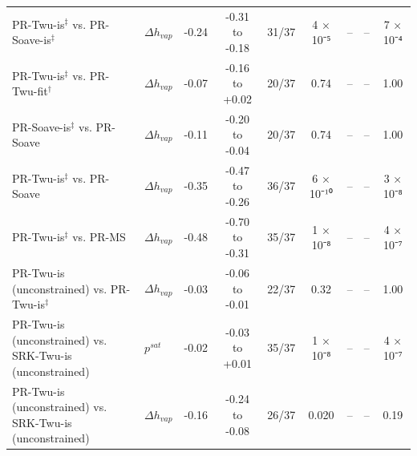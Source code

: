 \begin{table}[H]
\begin{tabular}{llccccccc}
PR-Twu-is$^{\ddagger}$ vs. PR-Soave-is$^{\ddagger}$ & $\Delta h_{vap}$ & -0.24 & -0.31 to -0.18 & 31/37 & 4 × 10⁻⁵ & -- & -- & 7 × 10⁻⁴ \\
PR-Twu-is$^{\ddagger}$ vs. PR-Twu-fit$^{\dagger}$ & $\Delta h_{vap}$ & -0.07 & -0.16 to +0.02 & 20/37 & 0.74 & -- & -- & 1.00 \\
PR-Soave-is$^{\ddagger}$ vs. PR-Soave & $\Delta h_{vap}$ & -0.11 & -0.20 to -0.04 & 20/37 & 0.74 & -- & -- & 1.00 \\
PR-Twu-is$^{\ddagger}$ vs. PR-Soave & $\Delta h_{vap}$ & -0.35 & -0.47 to -0.26 & 36/37 & 6 × 10⁻¹⁰ & -- & -- & 3 × 10⁻⁸ \\
PR-Twu-is$^{\ddagger}$ vs. PR-MS & $\Delta h_{vap}$ & -0.48 & -0.70 to -0.31 & 35/37 & 1 × 10⁻⁸ & -- & -- & 4 × 10⁻⁷ \\
PR-Twu-is (unconstrained) vs. PR-Twu-is$^{\ddagger}$ & $\Delta h_{vap}$ & -0.03 & -0.06 to -0.01 & 22/37 & 0.32 & -- & -- & 1.00 \\
PR-Twu-is (unconstrained) vs. SRK-Twu-is (unconstrained) & $p^{sat}$ & -0.02 & -0.03 to +0.01 & 35/37 & 1 × 10⁻⁸ & -- & -- & 4 × 10⁻⁷ \\
PR-Twu-is (unconstrained) vs. SRK-Twu-is (unconstrained) & $\Delta h_{vap}$ & -0.16 & -0.24 to -0.08 & 26/37 & 0.020 & -- & -- & 0.19 \\
\bottomrule
\end{tabular}
\end{table}
